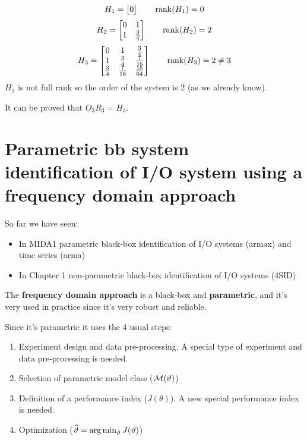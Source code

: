 \begin{example}
    \[
        H_1 = \begin{bmatrix}
            0
        \end{bmatrix}
        \qquad \operatorname*{rank} (H_1) = 0
    \]
    \[
        H_2 = \begin{bmatrix}
            0 & 1 \\
            1 & \frac{3}{4}
        \end{bmatrix}
        \qquad \operatorname*{rank} (H_2) = 2
    \]
    \[
        H_3 = \begin{bmatrix}
            0 & 1 & \frac{3}{4} \\
            1 & \frac{3}{4} & \frac{7}{16} \\
            \frac{3}{4} & \frac{7}{16} & \frac{15}{64}
        \end{bmatrix}
        \qquad \operatorname*{rank} (H_3) = 2 \neq 3
    \]
    $H_3$ is not full rank so the order of the system is 2 (as we already know). 
    
    It can be proved that $O_3R_3 = H_3$.
\end{example}

\chapter{Parametric \acrlong{bb} system identification of I/O system using a frequency domain approach}

So far we have seen:
\begin{itemize}
    \item In MIDA1 parametric black-box identification of I/O systems (\gls{armax}) and time series (\gls{arma})
    \item In Chapter 1 non-parametric black-box identification of I/O systems (4SID)
\end{itemize}

The \textbf{frequency domain approach} is a black-box and \textbf{parametric}, and it's very used in practice since it's very robust and reliable.

Since it's parametric it uses the 4 usual steps:
\begin{enumerate}
    \item Experiment design and data pre-processing. A special type of experiment and data pre-processing is needed.
    \item Selection of parametric model class ($\mathcal{M}(\vartheta)$)
    \item Definition of a performance index ($J(\theta)$). A new special performance index is needed.
    \item Optimization ($\widehat{\vartheta} = \operatorname*{arg\,min}_\vartheta J(\vartheta)$)
\end{enumerate}

